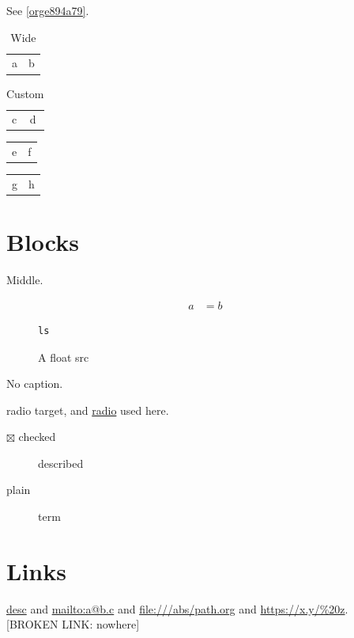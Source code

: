 \documentclass[11pt]{article}
\begin{document}
See \ref{orge894a79}.\\

\begin{table}[htbp]
\caption{Wide}
\centering
\footnotesize
\begin{tabular}{ll}
a & b\\
\end{tabular}
\end{table}

\begin{table}[htbp]
\caption{Custom}
\centering
\begin{tabular}{ll}
c & d\\
\end{tabular}
\end{table}

\begin{table}[t]
\centering
\begin{tabular}{ll}
e & f\\
\end{tabular}
\end{table}

\begin{center}
\small
\begin{tabular}{ll}
g & h\\
\end{tabular}
\end{center}
\section{Blocks}
\label{sec:org6c7538d}
\label{org0711760}
\begin{center}
Middle.\\
\end{center}

\begin{align*}
\label{eq:org9dc24ab}
a &= b
\end{align*}

\begin{figure}[htbp]
\begin{verbatim}
ls
\end{verbatim}
\caption{A float src}
\end{figure}

\begin{mybox}
No caption.\\
\end{mybox}

\label{org5f46c53}radio target, and \hyperref[org5f46c53]{radio} used here.\\

\begin{description}
\item[{$\boxtimes$ checked}] described\\
\item[{plain}] term\\
\end{description}
\section{Links}
\label{sec:orgb5ff499}
\href{https://example.com/a\_b?x=1\&y=2}{desc} and \url{mailto:a@b.c} and \url{file:///abs/path.org} and \url{https://x.y/\%20z}.\\
{[}BROKEN LINK: nowhere]\\
\end{document}

